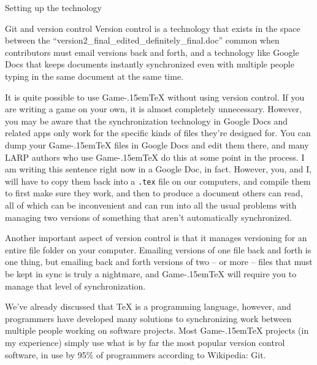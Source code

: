 \documentclass[11pt]{article}
\def\gametex{\mbox{Game\kern-.15em\TeX}}
\begin{document}
\begin{section}{Setting up the technology}
\begin{subsection}{Git and version control}
Version control is a technology that exists in the space between the ``version2\_final\_edited\_definitely\_final.doc'' common when contributors must email versions back and forth, and a technology like Google Docs that keeps documents instantly synchronized even with multiple people typing in the same document at the same time.

It is quite possible to use \gametex{} without using version control.  If you are writing a game on your own, it is almost completely unnecessary.  However, you may be aware that the synchronization technology in Google Docs and related apps only work for the specific kinds of files they're designed for.  You can dump your \gametex{} files in Google Docs and edit them there, and many LARP authors who use \gametex{} do this at some point in the process.  I am writing this sentence right now in a Google Doc, in fact.  However, you, and I, will have to copy them back into a \texttt{.tex} file on our computers, and compile them to first make sure they work, and then to produce a document others can read, all of which can be inconvenient and can run into all the usual problems with managing two versions of something that aren't automatically synchronized.

Another important aspect of version control is that it manages versioning for an entire file folder on your computer.  Emailing versions of one file back and forth is one thing, but emailing back and forth versions of two -- or more -- files that must be kept in sync is truly a nightmare, and \gametex{} will require you to manage that level of synchronization.

We've already discussed that \TeX{} is a programming language, however, and programmers have developed many solutions to synchronizing work between multiple people working on software projects.  Most \gametex{} projects (in my experience) simply use what is by far the most popular version control software, in use by 95\% of programmers according to Wikipedia: Git.


\end{subsection}
\end{section}
\end{document}

